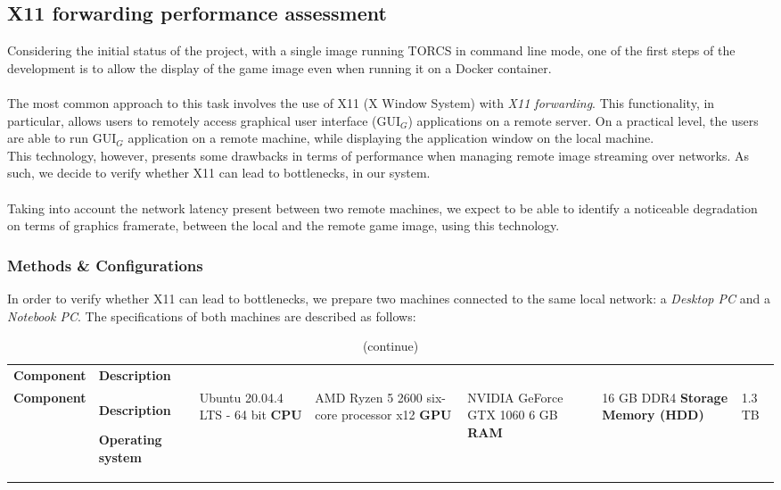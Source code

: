 \subsection{X11 forwarding performance assessment} \label{X11-forwarding-assessment-desc}
Considering the initial status of the project, with a single image running TORCS in command line mode, one of the first steps of the development is to allow the display of the game image even when running it on a Docker container. \\ \\
The most common approach to this task involves the use of X11 (X Window System) with \textit{X11 forwarding}. This functionality, in particular, allows users to remotely access graphical user interface (GUI$_G$) applications on a remote server. On a practical level, the users are able to run GUI$_G$ application on a remote machine, while displaying the application window on the local machine. \\
This technology, however, presents some drawbacks in terms of performance when managing remote image streaming over networks. As such, we decide to verify whether X11 can lead to bottlenecks, in our system. \\ \\
Taking into account the network latency present between two remote machines, we expect to be able to identify a noticeable degradation on terms of graphics framerate, between the local and the remote game image, using this technology. 

\subsubsection{Methods \& Configurations}
In order to verify whether X11 can lead to bottlenecks, we prepare two machines connected to the same local network: a \textit{Desktop PC} and a \textit{Notebook PC}. The specifications of both machines are described as follows:

\def\arraystretch{1.75}
\begin{longtable}{ 
		>{\centering}p{} 
		>{\centering}p{}}
	
	
	\caption{Desktop machine specifications.} \label{desktop-machine-specifications} \\
	\coloredTableHead
	\textbf{\color{white}Component} & 
	\centering\textbf{\color{white}Description}
	\endfirsthead
	
	\caption[]{(continue)}\\
	\textbf{\color{white}Component} &
	\centering\textbf{\color{white}Description}
	\endhead
	
	\textbf{Operating system} & Ubuntu 20.04.4 LTS - 64 bit \cr
	\textbf{CPU} & AMD Ryzen 5 2600 six-core processor x12 \cr
	\textbf{GPU} & NVIDIA GeForce GTX 1060 6 GB \cr
	\textbf{RAM} & 16 GB DDR4 \cr
	\textbf{Storage Memory (HDD)} & 1.3 TB \cr
\end{longtable}

